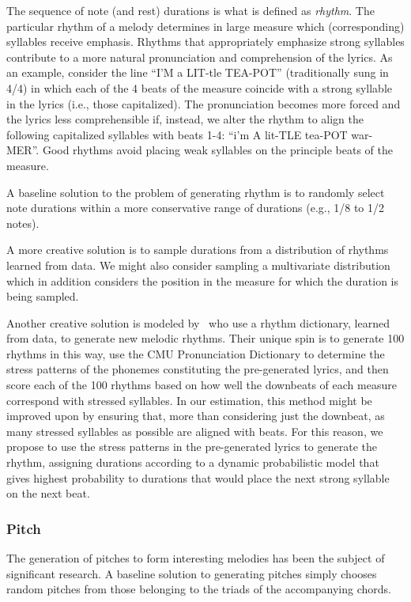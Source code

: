 \documentclass[11pt,phd]{byuprop}
\begin{document}
The sequence of note (and rest) durations is what is defined as \emph{rhythm}. The particular rhythm of a melody determines in large measure which (corresponding) syllables receive emphasis. Rhythms that appropriately emphasize strong syllables contribute to a more natural pronunciation and comprehension of the lyrics. As an example, consider the line ``I'M a LIT-tle TEA-POT'' (traditionally sung in 4/4) in which each of the 4 beats of the measure coincide with a strong syllable in the lyrics (i.e., those capitalized). The pronunciation becomes more forced and the lyrics less comprehensible if, instead, we alter the rhythm to align the following capitalized syllables with beats 1-4: ``i'm A lit-TLE tea-POT war-MER''. Good rhythms avoid placing weak syllables on the principle beats of the measure.

A baseline solution to the problem of generating rhythm is to randomly select note durations within a more conservative range of durations (e.g., 1/8 to 1/2 notes). 

A more creative solution is  to sample durations from a distribution of rhythms learned from data. We might also consider sampling a multivariate distribution which in addition considers the position in the measure for which the duration is being sampled.

Another creative solution is modeled by~\cite{monteith2012automatic} who use a rhythm dictionary, learned from data, to generate new melodic rhythms. Their unique spin is to generate 100 rhythms in this way, use the CMU Pronunciation Dictionary to determine the stress patterns of the phonemes constituting the pre-generated lyrics, and then score each of the 100 rhythms based on how well the downbeats of each measure correspond with stressed syllables. In our estimation, this method might be improved upon by ensuring that, more than considering just the downbeat, as many stressed syllables as possible are aligned with beats. For this reason, we propose to use the stress patterns in the pre-generated lyrics to generate the rhythm, assigning durations according to a dynamic probabilistic model that gives highest probability to durations that would place the next strong syllable on the next beat.

\subsubsection{Pitch}

The generation of pitches to form interesting melodies has been the subject of significant research. A baseline solution to generating pitches simply chooses random pitches from those belonging to the triads of the accompanying chords. 
\end{document}

